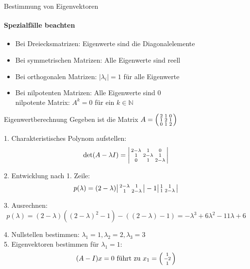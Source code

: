 \begin{KR}{Bestimmung von Eigenvektoren}
\paragraph{Spezialfälle beachten}
\begin{itemize}
    \item Bei Dreiecksmatrizen: Eigenwerte sind die Diagonalelemente
    \item Bei symmetrischen Matrizen: Alle Eigenwerte sind reell
    \item Bei orthogonalen Matrizen: $|\lambda_i| = 1$ für alle Eigenwerte
    \item Bei nilpotenten Matrizen: Alle Eigenwerte sind 0\\
    nilpotente Matrix: $A^k = 0$ für ein $k \in \mathbb{N}$
\end{itemize}
\end{KR}

\begin{example2}{Eigenwertberechnung}
Gegeben ist die Matrix
$A = \begin{psmallmatrix} 
2 & 1 & 0 \\
1 & 2 & 1 \\
0 & 1 & 2
\end{psmallmatrix}$

1. Charakteristisches Polynom aufstellen:
   $$\det(A - \lambda I) = \begin{vsmallmatrix} 
   2-\lambda & 1 & 0 \\
   1 & 2-\lambda & 1 \\
   0 & 1 & 2-\lambda
   \end{vsmallmatrix}$$
   
2. Entwicklung nach 1. Zeile:
   $$p(\lambda) = (2-\lambda)\begin{vsmallmatrix}
   2-\lambda & 1 \\
   1 & 2-\lambda
   \end{vsmallmatrix} - 1\begin{vsmallmatrix}
   1 & 1 \\
   1 & 2-\lambda
   \end{vsmallmatrix}$$
   
3. Ausrechnen:
   $$p(\lambda) = (2-\lambda)((2-\lambda)^2 - 1) - ((2-\lambda) - 1)
   = -\lambda^3 + 6\lambda^2 - 11\lambda + 6$$
   
4. Nullstellen bestimmen:
   $\lambda_1 = 1, \lambda_2 = 2, \lambda_3 = 3$
\vspace{1mm}\\
5. Eigenvektoren bestimmen für $\lambda_1 = 1$:
   $$(A - I)x = 0 \text{ führt zu } x_1 = \begin{psmallmatrix} 1 \\ -2 \\ 1 \end{psmallmatrix}$$
\end{example2}

